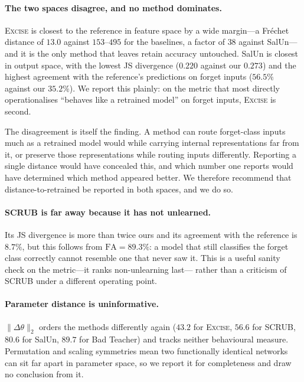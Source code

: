 \documentclass{article}
\newcommand{\ours}{\textsc{Excise}}
\theoremstyle{remark}
\theoremstyle{plain}
\begin{document}
\paragraph{The two spaces disagree, and no method dominates.}
\ours{} is closest to the reference in feature space by a wide margin---a
Fr\'echet distance of $13.0$ against $153$--$495$ for the baselines, a factor of
$38$ against SalUn---and it is the only method that leaves retain accuracy
untouched. SalUn is closest in output space, with the lowest JS divergence
($0.220$ against our $0.273$) and the highest agreement with the reference's
predictions on forget inputs ($56.5\%$ against our $35.2\%$). We report this
plainly: on the metric that most directly operationalises ``behaves like a
retrained model'' on forget inputs, \ours{} is second.

The disagreement is itself the finding. A method can route forget-class inputs
much as a retrained model would while carrying internal representations far from
it, or preserve those representations while routing inputs differently. Reporting
a single distance would have concealed this, and which number one reports would
have determined which method appeared better. We therefore recommend that
distance-to-retrained be reported in both spaces, and we do so.

\paragraph{SCRUB is far away because it has not unlearned.}
Its JS divergence is more than twice ours and its agreement with the reference
is $8.7\%$, but this follows from $\mathrm{FA} = 89.3\%$: a model that still
classifies the forget class correctly cannot resemble one that never saw it.
This is a useful sanity check on the metric---it ranks non-unlearning last---%
rather than a criticism of SCRUB under a different operating point.

\paragraph{Parameter distance is uninformative.}
$\|\Delta\theta\|_2$ orders the methods differently again ($43.2$ for \ours{},
$56.6$ for SCRUB, $80.6$ for SalUn, $89.7$ for Bad Teacher) and tracks neither
behavioural measure. Permutation and scaling symmetries mean two functionally
identical networks can sit far apart in parameter space, so we report it for
completeness and draw no conclusion from it.
\end{document}
